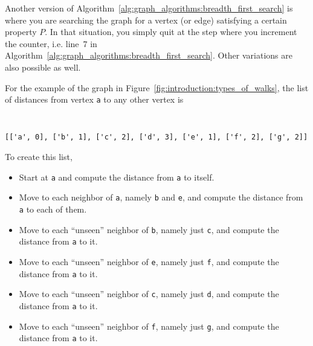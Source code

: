 
Another version of
Algorithm~\ref{alg:graph_algorithms:breadth_first_search} is where you
are searching the graph for a vertex (or edge) satisfying a certain
property $P$. In that situation, you simply quit at the step where you
increment the counter, i.e. line~7 in
Algorithm~\ref{alg:graph_algorithms:breadth_first_search}. Other
variations are also possible as well.

For the example of the graph in
Figure~\ref{fig:introduction:types_of_walks}, the list of distances
from vertex \verb!a! to any other vertex is
%
\begin{center}
\fontsize{9pt}{9pt}
\selectfont
\tt
\begin{lstlisting}
[['a', 0], ['b', 1], ['c', 2], ['d', 3], ['e', 1], ['f', 2], ['g', 2]]
\end{lstlisting}
\end{center}
%
To create this list,
%
\begin{itemize}
\item
Start at \verb!a! and compute the distance from \verb!a! to itself.

\item
Move to each neighbor of \verb!a!, namely \verb!b! and \verb!e!, and
compute the distance from \verb!a! to each of them.

\item
Move to each ``unseen'' neighbor of \verb!b!, namely just \verb!c!,
and compute the distance from \verb!a! to it.

\item
Move to each ``unseen'' neighbor of \verb!e!, namely just \verb!f!,
and compute the distance from \verb!a! to it.

\item
Move to each ``unseen'' neighbor of \verb!c!, namely just \verb!d!,
and compute the distance from \verb!a! to it.

\item
Move to each ``unseen'' neighbor of \verb!f!, namely just \verb!g!,
and compute the distance from \verb!a! to it.
\end{itemize}

